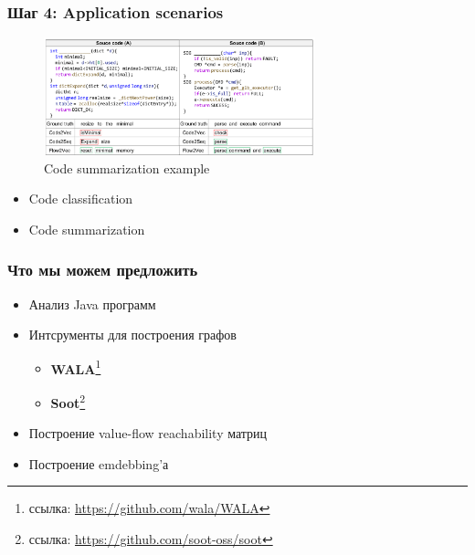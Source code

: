 \documentclass[xcolor=table,english]{beamer}
\begin{document}
\begin{frame}[fragile] \frametitle{Шаг 4: Application scenarios}
    \begin{minipage}[m]{\linewidth}
        \begin{figure}
            \centering
            \includegraphics[width=0.7\textwidth]{figures/code_summarization_example.png}
            \caption{Code summarization example}
            \label{fig:code_summ_ex}
        \end{figure}
    \end{minipage}\hfill
    \begin{minipage}[m]{\linewidth}
        \begin{itemize}
            \item Code classification
            \item Code summarization
        \end{itemize}
    \end{minipage}
\end{frame}

\begin{frame}[fragile] \frametitle{Что мы можем предложить}
    \begin{itemize}
        \item Анализ Java программ
        \item Интсрументы для построения графов
        {
            \begin{itemize}
                \item \textbf{WALA}\footnote{ссылка: \href{https://github.com/wala/WALA}{https://github.com/wala/WALA}}
                \item \textbf{Soot}\footnote{ссылка: \href{https://github.com/soot-oss/soot}{https://github.com/soot-oss/soot}}
            \end{itemize}
        }
        \item Построение value-flow reachability матриц
        \item Построение emdebbing'а
    \end{itemize}
\end{frame}
\end{document}
